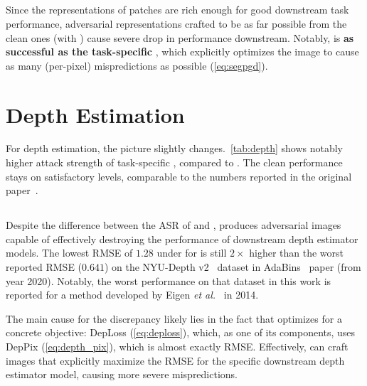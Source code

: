 \subsection{\EmbedAttack}

Since the representations of patches are rich enough for good downstream task performance, adversarial representations crafted to be as far possible from the clean ones (with \EmbedAttack) cause severe drop in performance downstream. Notably, \EmbedAttack is \textbf{as successful as the task-specific} \SegPGD, which explicitly optimizes the image to cause as many (per-pixel) mispredictions as possible (\cref{eq:segpgd}).



\section{Depth Estimation}\label{sec:results_dep}

For depth estimation, the picture slightly changes.~\cref{tab:depth} shows notably higher attack strength of task-specific \DepthPGD, compared to \EmbedAttack. The clean performance stays on satisfactory levels, comparable to the numbers reported in the original \DINOvtwo paper~\cite{dinov2}.



\subsection{\EmbedAttack}

Despite the difference between the ASR of \EmbedAttack and \DepthPGD, \EmbedAttack produces adversarial images capable of effectively destroying the performance of downstream depth estimator models. The lowest RMSE of $1.28$ under \EmbedAttack for \DINOvone is still $2\times$ higher than the worst reported RMSE ($0.641$) on the NYU-Depth v2~\cite{nyudepth} dataset in AdaBins~\cite{adabins} paper (from year 2020). Notably, the worst performance on that dataset in this work is reported for a method developed by Eigen \textit{et al.}~\cite{eigen2014depth} in 2014.

The main cause for the discrepancy likely lies in the fact that \DepthPGD optimizes for a concrete objective: DepLoss (\cref{eq:deploss}), which, as one of its components, uses DepPix (\cref{eq:depth_pix}), which is almost exactly RMSE. Effectively, \DepthPGD can craft images that explicitly maximize the RMSE for the specific downstream depth estimator model, causing more severe mispredictions.

